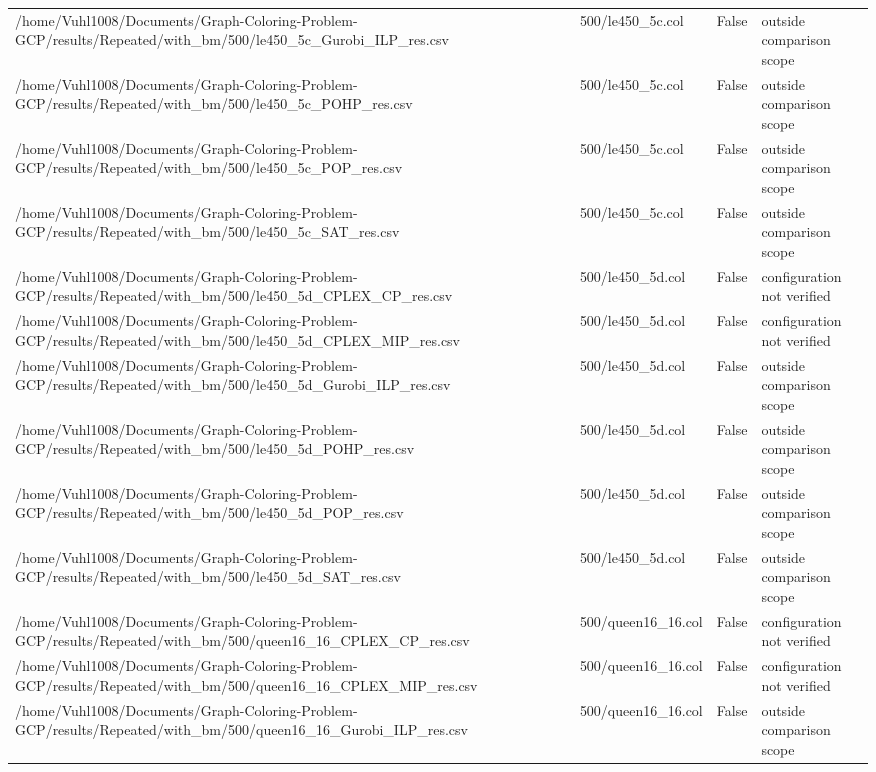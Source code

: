 \begin{table}[htbp]
\begin{tabular}{llll}
/home/Vuhl1008/Documents/Graph-Coloring-Problem-GCP/results/Repeated/with\_bm/500/le450\_5c\_Gurobi\_ILP\_res.csv & 500/le450\_5c.col & False & outside comparison scope \\
/home/Vuhl1008/Documents/Graph-Coloring-Problem-GCP/results/Repeated/with\_bm/500/le450\_5c\_POHP\_res.csv & 500/le450\_5c.col & False & outside comparison scope \\
/home/Vuhl1008/Documents/Graph-Coloring-Problem-GCP/results/Repeated/with\_bm/500/le450\_5c\_POP\_res.csv & 500/le450\_5c.col & False & outside comparison scope \\
/home/Vuhl1008/Documents/Graph-Coloring-Problem-GCP/results/Repeated/with\_bm/500/le450\_5c\_SAT\_res.csv & 500/le450\_5c.col & False & outside comparison scope \\
/home/Vuhl1008/Documents/Graph-Coloring-Problem-GCP/results/Repeated/with\_bm/500/le450\_5d\_CPLEX\_CP\_res.csv & 500/le450\_5d.col & False & configuration not verified \\
/home/Vuhl1008/Documents/Graph-Coloring-Problem-GCP/results/Repeated/with\_bm/500/le450\_5d\_CPLEX\_MIP\_res.csv & 500/le450\_5d.col & False & configuration not verified \\
/home/Vuhl1008/Documents/Graph-Coloring-Problem-GCP/results/Repeated/with\_bm/500/le450\_5d\_Gurobi\_ILP\_res.csv & 500/le450\_5d.col & False & outside comparison scope \\
/home/Vuhl1008/Documents/Graph-Coloring-Problem-GCP/results/Repeated/with\_bm/500/le450\_5d\_POHP\_res.csv & 500/le450\_5d.col & False & outside comparison scope \\
/home/Vuhl1008/Documents/Graph-Coloring-Problem-GCP/results/Repeated/with\_bm/500/le450\_5d\_POP\_res.csv & 500/le450\_5d.col & False & outside comparison scope \\
/home/Vuhl1008/Documents/Graph-Coloring-Problem-GCP/results/Repeated/with\_bm/500/le450\_5d\_SAT\_res.csv & 500/le450\_5d.col & False & outside comparison scope \\
/home/Vuhl1008/Documents/Graph-Coloring-Problem-GCP/results/Repeated/with\_bm/500/queen16\_16\_CPLEX\_CP\_res.csv & 500/queen16\_16.col & False & configuration not verified \\
/home/Vuhl1008/Documents/Graph-Coloring-Problem-GCP/results/Repeated/with\_bm/500/queen16\_16\_CPLEX\_MIP\_res.csv & 500/queen16\_16.col & False & configuration not verified \\
/home/Vuhl1008/Documents/Graph-Coloring-Problem-GCP/results/Repeated/with\_bm/500/queen16\_16\_Gurobi\_ILP\_res.csv & 500/queen16\_16.col & False & outside comparison scope \\

\end{tabular}
\end{table}
